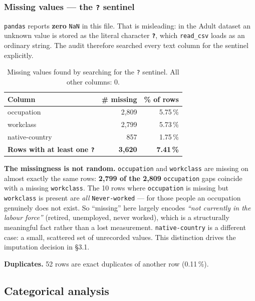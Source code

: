 \documentclass[11pt,a4paper]{article}
\newcommand{\code}[1]{\texttt{\small #1}}
\begin{document}
\subsubsection*{Missing values --- the \code{?} sentinel}

\code{pandas} reports \textbf{zero} \code{NaN} in this file. That is misleading: in the
Adult dataset an unknown value is stored as the literal character \textbf{\code{?}}, which
\code{read\_csv} loads as an ordinary string. The audit therefore searched every text
column for the sentinel explicitly.

\begin{table}[H]
\centering
\caption{Missing values found by searching for the \code{?} sentinel. All other columns: 0.}
\small
\begin{tabular}{lrr}
\toprule
\textbf{Column} & \textbf{\# missing} & \textbf{\% of rows} \\
\midrule
occupation      & 2{,}809 & 5.75\,\% \\
workclass       & 2{,}799 & 5.73\,\% \\
native-country  & 857     & 1.75\,\% \\
\midrule
\textbf{Rows with at least one \code{?}} & \textbf{3{,}620} & \textbf{7.41\,\%} \\
\bottomrule
\end{tabular}
\end{table}

\noindent
\textbf{The missingness is not random.} \code{occupation} and \code{workclass} are missing
on almost exactly the same rows: \textbf{2{,}799 of the 2{,}809} \code{occupation} gaps
coincide with a missing \code{workclass}. The 10 rows where \code{occupation} is missing
but \code{workclass} is present are \emph{all} \code{Never-worked} --- for those people an
occupation genuinely does not exist. So ``missing'' here largely encodes
\emph{``not currently in the labour force''} (retired, unemployed, never worked), which is a
structurally meaningful fact rather than a lost measurement. \code{native-country} is a
different case: a small, scattered set of unrecorded values. This distinction drives the
imputation decision in \S3.1.

\medskip
\noindent
\textbf{Duplicates.} 52 rows are exact duplicates of another row (0.11\,\%).

\subsection{Categorical analysis}
\end{document}
